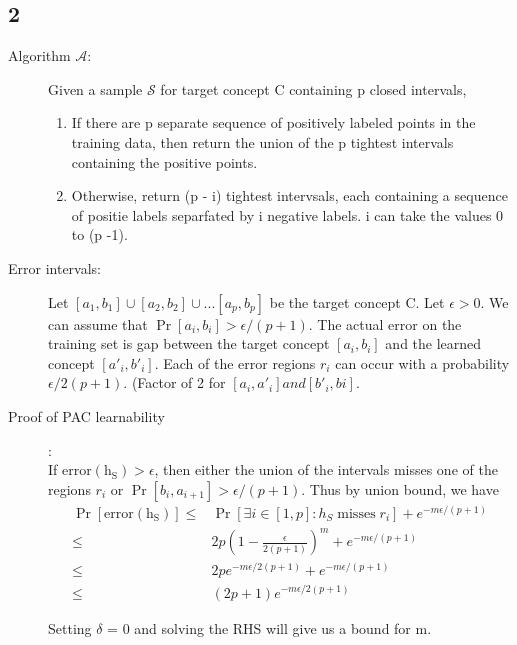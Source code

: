 \documentclass{article}
\begin{document}
\subsection*{2}
\begin{description}
  \item[Algorithm \( \mathcal{A} \):]  Given a sample \( \mathcal{S}\) for target concept C containing p closed intervals,
    \begin{enumerate}
      \item If there are p separate sequence of positively labeled points in the training data, then return the union of the p tightest intervals containing the positive points.
      \item Otherwise, return (p - i) tightest intervsals, each containing a sequence of positie labels separfated by i negative labels.  i can take the values 0 to (p -1).
    \end{enumerate}
  \item[Error intervals:] Let \( [a_{1}, b_{1}] \cup [a_{2}, b_{2}] \cup ... [a_{p}, b_{p}] \) be the target concept C.  Let \( \epsilon > 0\). We can assume that \(\Pr[a_{i}, b_{i}] > \epsilon/(p + 1) \).  The actual error on the training set is gap between the target concept \( [a_{i}, b_{i}]\) and the learned concept \( [a'_{i}, b'_{i}] \).  Each of the error regions \( r_{i}\) can occur with a probability \( \epsilon/2(p + 1) \). (Factor of 2 for \( [a_{i}, a'_{i}] and [b'_{i}, b{i}] \).
  \item[Proof of PAC learnability]:\\
    If \( \mathrm{error(h_{S})} > \epsilon\), then either the union of the intervals misses one of the regions \( r_{i} \) or \( \Pr[b_{i}, a_{i+1}] > \epsilon/(p+1)\).  Thus by union bound, we have
    \begin{align*}
      \Pr[\mathrm{error(h_{S})}] \le & \Pr[\exists{i} \in [1, p]: h_{S} \; \mathrm{misses} \; r_{i}] + e^{-m\epsilon/(p+1)}\\
      \le & 2p(1-\frac{\epsilon}{2(p+1)})^{m} + e^{-m\epsilon/(p+1)}\\
      \le & 2pe^{-m\epsilon/{2(p+1)}} + e^{-m\epsilon/(p+1)}\\
      \le & (2p+1)e^{-m\epsilon/2(p+1)}
    \end{align*}

    Setting \( \delta \) = 0 and solving the RHS will give us a bound for m.


\end{description}
\end{document}
